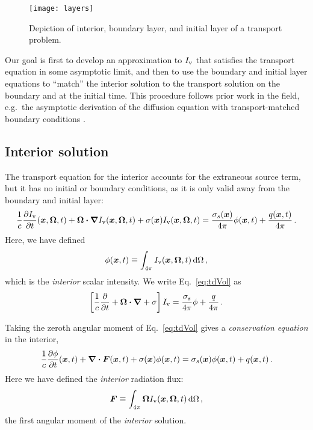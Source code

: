\begin{figure}[htb]
  \centering
  \texttt{[image: layers]}
  \caption{Depiction of interior, boundary layer, and initial layer of a
  transport problem.}
  \label{fig:layers}
\end{figure}

Our goal is first to develop an approximation to $I_\mathrm{v}$ that satisfies the transport
equation in some asymptotic limit, and then to use the boundary and initial layer
equations to ``match'' the interior solution to the transport solution on the
boundary and at the initial time. This procedure follows prior work in the
field, e.g.~the asymptotic derivation of the diffusion equation with
transport-matched boundary conditions \cite{Mal1991}.

\subsection{Interior solution}\label{sec:adInterior}

The transport equation for the interior accounts for the extraneous source term,
but
it has no initial or boundary conditions, as it is only valid away from the
boundary and initial layer:
\begin{equation} \label{eq:tdVol}
  \frac{1}{c}\frac{\partial I_\mathrm{v}}{\partial t}(\bm{x},\bm{\Omega},t)
  + \bm{\Omega}\bm{\cdot} \bm{\nabla} I_\mathrm{v}(\bm{x},\bm{\Omega},t)
  + \sigma(\bm{x}) I_\mathrm{v}(\bm{x},\bm{\Omega},t)
  = \frac{\sigma_s(\bm{x})}{4\pi}
  \phi(\bm{x},t) + \frac{q(\bm{x},t)}{4\pi} \,.
\end{equation}
Here, we have defined
\begin{equation} \label{eq:tdPhi}
  \phi(\bm{x}, t) \equiv \int_{4\pi} I_\mathrm{v}(\bm{x}, \bm{\Omega},t) \mathop{}\!\mathrm{d} \Omega\,,
\end{equation}
which is the \emph{interior} scalar intensity. We write Eq.~\eqref{eq:tdVol} as
\begin{equation*}
  \left[ \frac{1}{c}\frac{\partial }{\partial t}
  + \bm{\Omega}\bm{\cdot} \bm{\nabla}
  + \sigma \right] I_\mathrm{v}
  = \frac{\sigma_s}{4\pi}
  \phi + \frac{q}{4\pi} \,.
\end{equation*}

Taking the zeroth angular moment of Eq.~\eqref{eq:tdVol} gives a
\emph{conservation equation} in the interior,
\begin{equation} \label{eq:loVol}
\frac{1}{c} \frac{\partial \phi}{\partial t} (\bm{x}, t)
  + \bm{\nabla} \bm{\cdot}\bm{F}(\bm{x}, t)
  + \sigma(\bm{x}) \phi(\bm{x}, t)
 = \sigma_s(\bm{x}) \phi(\bm{x},t) + q(\bm{x},t)\,.
\end{equation}
Here we have defined the \emph{interior} radiation flux:
\begin{equation}\label{eq:tdF}
  \bm{F} \equiv \int_{4\pi} \bm{\Omega} I_\mathrm{v}(\bm{x}, \bm{\Omega},t) \mathop{}\!\mathrm{d}
  \Omega\,,
\end{equation}
the first angular moment of the \emph{interior} solution.


